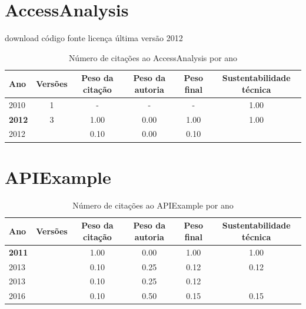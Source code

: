 \section{AccessAnalysis}
\checkmark download
\checkmark código fonte
\checkmark licença
\checkmark última versão 2012


\begin{table}[H]
\caption{Número de citações ao AccessAnalysis por ano}
\centering
\begin{tabular}{| l | c | c | c | c | c |}
  \hline
  Ano & Versões & Peso da citação & Peso da autoria & Peso final & Sustentabilidade técnica \\
  \hline
        2010 & 1 & - & - & -
        &
          {\color{blue} 1.00}
        \\
\hline
            {\bf 2012}
          &
          3
          &
          1.00
          &
          0.00
          &
          1.00
          &
            {\color{blue} 1.00}
          \\
            2012
          &
          
          &
          0.10
          &
          0.00
          &
          0.10
          &
          \\
\hline
\end{tabular}
\end{table}



\section{APIExample}


\begin{table}[H]
\caption{Número de citações ao APIExample por ano}
\centering
\begin{tabular}{| l | c | c | c | c | c |}
  \hline
  Ano & Versões & Peso da citação & Peso da autoria & Peso final & Sustentabilidade técnica \\
  \hline
            {\bf 2011}
          &
          
          &
          1.00
          &
          0.00
          &
          1.00
          &
            {\color{blue} 1.00}
          \\
\hline
            2013
          &
          
          &
          0.10
          &
          0.25
          &
          0.12
          &
            {\color{red} 0.12}
          \\
            2013
          &
          
          &
          0.10
          &
          0.25
          &
          0.12
          &
          \\
\hline
            2016
          &
          
          &
          0.10
          &
          0.50
          &
          0.15
          &
            {\color{red} 0.15}
          \\
\hline
\end{tabular}
\end{table}



